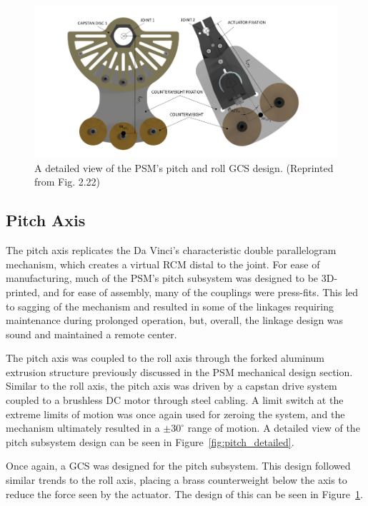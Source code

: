 \begin{figure}[H] %
    \centering
    \includegraphics[width=0.75\linewidth]{figures/PSM_GCS.png}
    \caption{A detailed view of the PSM's pitch and roll GCS design. (Reprinted from \cite{walder2022design} Fig. 2.22)}
    \label{fig:PSM_GCS}
\end{figure}


\subsection{Pitch Axis}
The pitch axis replicates the Da Vinci's characteristic double parallelogram mechanism, which creates a virtual RCM distal to the joint. For ease of manufacturing, much of the PSM's pitch subsystem was designed to be 3D-printed, and for ease of assembly, many of the couplings were press-fits. This led to sagging of the mechanism and resulted in some of the linkages requiring maintenance during prolonged operation, but, overall, the linkage design was sound and maintained a remote center.

The pitch axis was coupled to the roll axis through the forked aluminum extrusion structure previously discussed in the PSM mechanical design section. Similar to the roll axis, the pitch axis was driven by a capstan drive system coupled to a brushless DC motor through steel cabling. A limit switch at the extreme limits of motion was once again used for zeroing the system, and the mechanism ultimately resulted in a $\pm 30^\circ$ range of motion. A detailed view of the pitch subsystem design can be seen in Figure~\ref{fig:pitch_detailed}.

Once again, a GCS was designed for the pitch subsystem. This design followed similar trends to the roll axis, placing a brass counterweight below the axis to reduce the force seen by the actuator. The design of this can be seen in Figure~\ref{fig:PSM_GCS}. 


